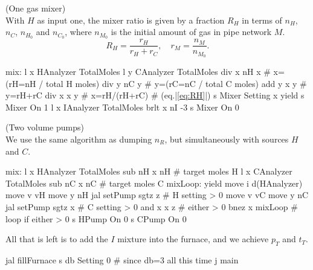 \documentclass{article}
\begin{document}
\begin{paracol}{2}
    \noindent
    (One gas mixer) \\

    \noindent
    With $H$ as input one, the mixer ratio is given by a fraction $R_H$
    in terms of $n_H$, $n_C$, $n_{H_0}$ and $n_{C_0}$,
    where $n_{M_0}$ is the initial amount of gas in pipe network $M$.
    \begin{equation}\label{eq:RH}
        R_H = \frac{r_H}{r_H+r_C},\quad
        r_M = \frac{n_M}{n_{M_0}}.
    \end{equation}
    \begin{mips}
        mix:
        l x HAnalyzer TotalMoles
        l y CAnalyzer TotalMoles
        div x nH x # x=(rH=nH / total H moles)
        div y nC y # y=(rC=nC / total C moles)
        add y x y # y=rH+rC
        div x x y # x=rH/(rH+rC) # (eq.|\ref{eq:RH}|)
        s Mixer Setting x
        yield
        s Mixer On 1
        l x IAnalyzer TotalMoles
        brlt x nI -3
        s Mixer On 0
    \end{mips}
    \switchcolumn
    \noindent
    (Two volume pumps) \\

    \noindent
    We use the same algorithm as dumping $n_R$, but simultaneously with
    sources $H$ and $C$.
    \begin{mips}
        mix:
        l x HAnalyzer TotalMoles
        sub nH x nH # target moles H
        l x CAnalyzer TotalMoles
        sub nC x nC # target moles C
        mixLoop:
        yield
        move i d(HAnalyzer)
        move v vH
        move y nH
        jal setPump
        sgtz z # H setting > 0
        move v vC
        move y nC
        jal setPump
        sgtz x # C setting > 0
        and x x z # either > 0
        bnez x mixLoop # loop if either > 0
        s HPump On 0
        s CPump On 0
    \end{mips}
\end{paracol}
All that is left is to add the $I$ mixture into the furnace,
and we achieve $p_T$ and $t_T$.
\begin{mips}
    jal fillFurnace
    s db Setting 0 # since db=3 all this time
    j main
\end{mips}
\end{document}
